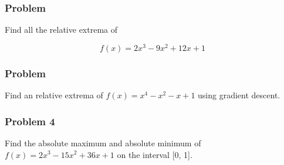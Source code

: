 \documentclass[
  letterpaper,
  DIV=11,
  numbers=noendperiod]{scrartcl}
\begin{document}
\hfill\break
\hfill\break
\hfill\break
\hfill\break
\hfill\break
\hfill\break
\hfill\break
\hfill\break
\hfill\break
\hfill\break
\hfill\break
\hfill\break
\hfill\break
\hfill\break
\hfill\break
\hfill\break
\hfill\break
\hfill\break
\hfill\break
\hfill\break
\hfill\break
\hfill\break
\hfill\break
\hfill\break
\thispagestyle{empty}

\subsubsection{Problem}\label{problem-8}

Find all the relative extrema of

\[
f(x) = 2x^3 -9x^2 + 12x + 1
\]

\hfill\break
\hfill\break
\hfill\break
\hfill\break
\hfill\break
\hfill\break
\hfill\break
\hfill\break
\hfill\break
\hfill\break
\hfill\break
\hfill\break
\hfill\break
\hfill\break
\hfill\break
\hfill\break
\hfill\break
\hfill\break
\hfill\break
\hfill\break
\thispagestyle{empty}

\subsubsection{Problem}\label{problem-9}

Find an relative extrema of \(f(x) = x^4 - x^2 - x + 1\) using gradient
descent.

\hfill\break
\hfill\break
\hfill\break
\hfill\break
\hfill\break
\hfill\break
\hfill\break
\hfill\break
\hfill\break
\hfill\break
\hfill\break
\hfill\break
\hfill\break
\hfill\break
\hfill\break
\hfill\break
\hfill\break
\hfill\break
\hfill\break
\hfill\break
\hfill\break
\hfill\break
\hfill\break
\hfill\break
\hfill\break
\hfill\break
\hfill\break
\hfill\break
\hfill\break
\hfill\break
\thispagestyle{empty}

\subsubsection{Problem 4}\label{problem-4-1}

Find the absolute maximum and absolute minimum of
\(f(x) = 2x^3 - 15x^2 + 36x + 1\) on the interval {[}0, 1{]}.

\hfill\break
\hfill\break
\hfill\break
\hfill\break
\hfill\break
\hfill\break
\hfill\break
\hfill\break
\hfill\break
\hfill\break
\hfill\break
\hfill\break
\hfill\break
\hfill\break
\hfill\break
\hfill\break
\hfill\break
\hfill\break
\hfill\break
\hfill\break
\thispagestyle{empty}
\end{document}
